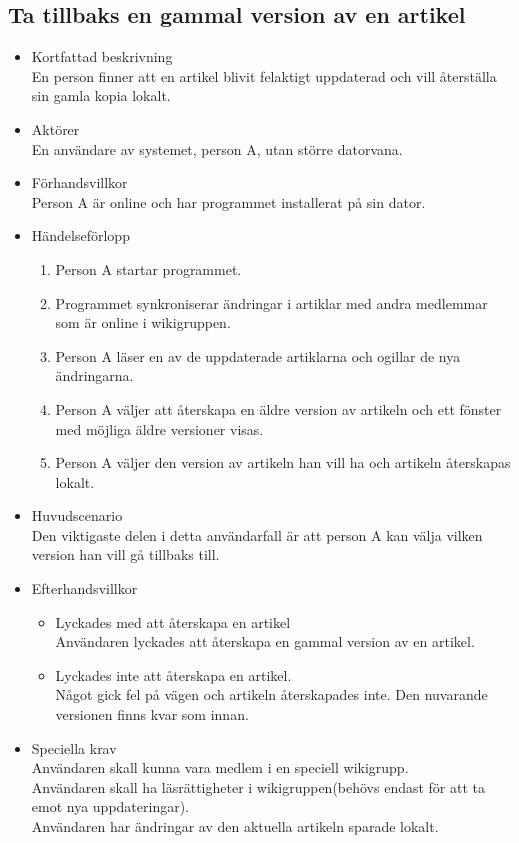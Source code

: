 \subsection{Ta tillbaks en gammal version av en artikel}
\begin{itemize}
	\item Kortfattad beskrivning
	\\En person finner att en artikel blivit felaktigt uppdaterad och vill återställa sin gamla kopia lokalt.
	\item Aktörer
	\\En användare av systemet, person A, utan större datorvana.
	\item Förhandsvillkor
	\\Person A är online och har programmet installerat på sin dator.
	\item Händelseförlopp
	\begin{enumerate}
		\item Person A startar programmet.
		\item Programmet synkroniserar ändringar i artiklar med andra medlemmar som är online i wikigruppen.
		\item Person A läser en av de uppdaterade artiklarna och ogillar de nya ändringarna.
		\item Person A väljer att återskapa en äldre version av artikeln och ett fönster med möjliga äldre versioner visas.
		\item Person A väljer den version av artikeln han vill ha och artikeln återskapas lokalt.
	\end{enumerate}	
	\item Huvudscenario
	\\Den viktigaste delen i detta användarfall är att person A kan välja vilken version han vill gå tillbaks till.
	\item Efterhandsvillkor	
	\begin{itemize}
		\item Lyckades med att återskapa en artikel
		\\Användaren lyckades att återskapa en gammal version av en artikel.
		\item Lyckades inte att återskapa en artikel.
		\\Något gick fel på vägen och artikeln återskapades inte. Den nuvarande versionen finns kvar som innan.
	\end{itemize}
	\item Speciella krav
	\\Användaren skall kunna vara medlem i en speciell wikigrupp.
	\\Användaren skall ha läsrättigheter i wikigruppen(behövs endast för att ta emot nya uppdateringar).
	\\Användaren har ändringar av den aktuella artikeln sparade lokalt.
\end{itemize}


